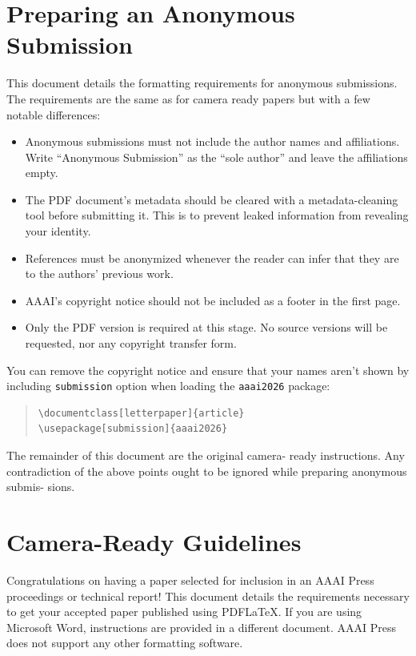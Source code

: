 \documentclass[letterpaper]{article} %
\begin{document}
\section{Preparing an Anonymous Submission}

This document details the formatting requirements for anonymous submissions. The requirements are the same as for camera ready papers but with a few notable differences:

\begin{itemize}
    \item Anonymous submissions must not include the author names and affiliations. Write ``Anonymous Submission'' as the ``sole author'' and leave the affiliations empty.
    \item The PDF document's metadata should be cleared with a metadata-cleaning tool before submitting it. This is to prevent leaked information from revealing your identity.
    \item References must be anonymized whenever the reader can infer that they are to the authors' previous work.
    \item AAAI's copyright notice should not be included as a footer in the first page.
    \item Only the PDF version is required at this stage. No source versions will be requested, nor any copyright transfer form.
\end{itemize}

You can remove the copyright notice and ensure that your names aren't shown by including \texttt{submission} option when loading the \texttt{aaai2026} package:

\begin{quote}\begin{scriptsize}\begin{verbatim}
\documentclass[letterpaper]{article}
\usepackage[submission]{aaai2026}
\end{verbatim}\end{scriptsize}\end{quote}

The remainder of this document are the original camera-
ready instructions. Any contradiction of the above points
ought to be ignored while preparing anonymous submis-
sions.

\section{Camera-Ready Guidelines}

Congratulations on having a paper selected for inclusion in an AAAI Press proceedings or technical report! This document details the requirements necessary to get your accepted paper published using PDF\LaTeX{}. If you are using Microsoft Word, instructions are provided in a different document. AAAI Press does not support any other formatting software.
\end{document}
